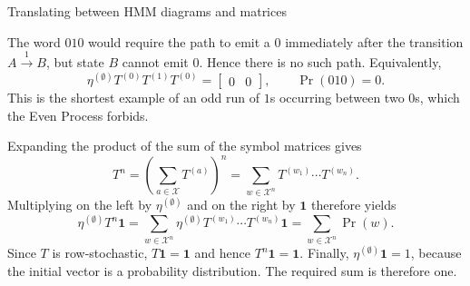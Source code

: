 \begin{exercise}[Core]{Translating between HMM diagrams and matrices}
\begin{solution}
\begin{parts}
\begin{subparts}
            The word $010$ would require the path to emit a $0$ immediately
            after the transition $A\xrightarrow{1}B$, but state $B$ cannot
            emit $0$. Hence there is no such path. Equivalently,
            \[
              \eta^{(\emptyset)}T^{(0)}T^{(1)}T^{(0)}
                =\begin{bmatrix}0&0\end{bmatrix},
              \qquad
              \Pr(010)=0.
            \]
            This is the shortest example of an odd run of $1$s occurring
            between two $0$s, which the Even Process forbids.
        \end{subparts}

      \item Expanding the product of the sum of the symbol matrices gives
        \[
          T^n
            =\left(\sum_{a\in\mathcal X}T^{(a)}\right)^n
            =\sum_{w\in\mathcal X^n}T^{(w_1)}\cdots T^{(w_n)}.
        \]
        Multiplying on the left by $\eta^{(\emptyset)}$ and on the right by
        $\mathbf 1$ therefore yields
        \[
          \eta^{(\emptyset)}T^n\mathbf 1
            =\sum_{w\in\mathcal X^n}
              \eta^{(\emptyset)}T^{(w_1)}\cdots T^{(w_n)}\mathbf 1
            =\sum_{w\in\mathcal X^n}\Pr(w).
        \]
        Since $T$ is row-stochastic, $T\mathbf 1=\mathbf 1$ and hence
        $T^n\mathbf 1=\mathbf 1$. Finally,
        $\eta^{(\emptyset)}\mathbf 1=1$, because the initial vector is a
        probability distribution. The required sum is therefore one.
    \end{parts}
  \end{solution}
\end{exercise}

